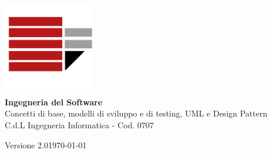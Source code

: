 \documentclass[a4paper,12pt,oneside]{book}
\begin{document}
\begin{titlepage}
    \centering
    
    \includegraphics[width=0.3\textwidth]{assets/logo.png}\\[3cm]
    
    {\huge\bfseries Ingegneria del Software}\\[0.5cm]
    
    {\Large Concetti di base, modelli di sviluppo e di testing, UML e Design Pattern}\\[0.5cm]

    {\small C.d.L Ingegneria Informatica - Cod. 0707}\\[0.5cm]
  
    \vfill
    
    {\large Versione 2.0}\hfill{\large \today}
        
\end{titlepage}

\tableofcontents








\end{document}
